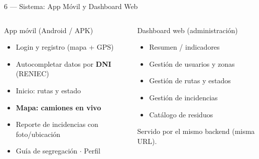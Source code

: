 \documentclass[aspectratio=169, 11pt]{beamer}
\begin{document}
\begin{frame}{6 — Sistema: App Móvil y Dashboard Web}
    \vspace{-0.3cm}
    \begin{columns}[T]
    \begin{block}{App móvil (Android / APK)}
        \footnotesize
        \begin{itemize}
            \item Login y registro (mapa + GPS)
            \item Autocompletar datos por \textbf{DNI} (RENIEC)
            \item Inicio: rutas y estado
            \item \textbf{Mapa: camiones en vivo}
            \item Reporte de incidencias con foto/ubicación
            \item Guía de segregación $\cdot$ Perfil
        \end{itemize}
    \end{block}

    \begin{block}{Dashboard web (administración)}
        \footnotesize
        \begin{itemize}
            \item Resumen / indicadores
            \item Gestión de usuarios y zonas
            \item Gestión de rutas y estados
            \item Gestión de incidencias
            \item Catálogo de residuos
        \end{itemize}
        \scriptsize Servido por el mismo backend (misma URL).
    \end{block}
    \end{columns}
    \vspace{0.1cm}
\end{frame}
\end{document}
